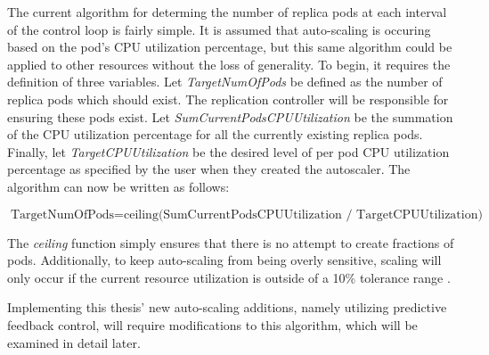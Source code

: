 The current algorithm for determing the number of replica pods at each interval
of the control loop is fairly simple. It is assumed that auto-scaling is
occuring based on the pod's CPU utilization percentage, but this same algorithm
could be applied to other resources without the loss of generality.
To begin, it requires the definition of
three variables. Let \textit{TargetNumOfPods} be defined as the number of
replica pods which should exist. The replication controller will be responsible
for ensuring these pods exist. Let \textit{SumCurrentPodsCPUUtilization} be the
summation of the CPU utilization percentage for all the currently existing
replica pods. Finally, let \textit{TargetCPUUtilization} be the desired level of
per pod CPU utilization percentage as specified by the user when they created
the autoscaler. The algorithm can now be written as follows:

\[ \mbox{TargetNumOfPods} = \mbox{ceiling(SumCurrentPodsCPUUtilization /
TargetCPUUtilization)} \]

The \textit{ceiling} function simply ensures that there is no attempt to create
fractions of pods. Additionally, to keep auto-scaling from being overly
sensitive, scaling will only occur if the current resource utilization is
outside of a 10\% tolerance range \cite{k8s-horizontal-pod-autoscaler-proposal}.

Implementing this thesis' new auto-scaling additions, namely utilizing
predictive feedback control, will require modifications to this algorithm, which
will be examined in detail later.
